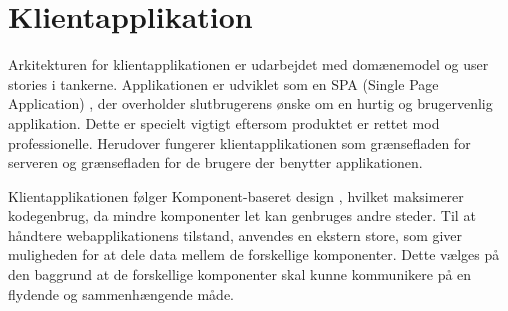 \newpage
\section{Klientapplikation}

Arkitekturen for klientapplikationen er udarbejdet med domænemodel \cite[Domænemodel]{converge-terms} og user stories i tankerne. Applikationen er udviklet som en SPA (Single Page Application) \cite[SPA]{converge-terms}, der overholder slutbrugerens ønske om en hurtig og brugervenlig applikation. Dette er specielt vigtigt eftersom produktet er rettet mod professionelle. Herudover fungerer klientapplikationen som grænsefladen for serveren og grænsefladen for de brugere der benytter applikationen.

Klientapplikationen følger Komponent-baseret design \cite[Komponent-baseret design]{converge-terms}, hvilket maksimerer kodegenbrug, da mindre komponenter let kan genbruges andre steder. Til at håndtere webapplikationens tilstand, anvendes en ekstern store, som giver muligheden for at dele data mellem de forskellige komponenter. Dette vælges på den baggrund at de forskellige komponenter skal kunne kommunikere på en flydende og sammenhængende måde.


